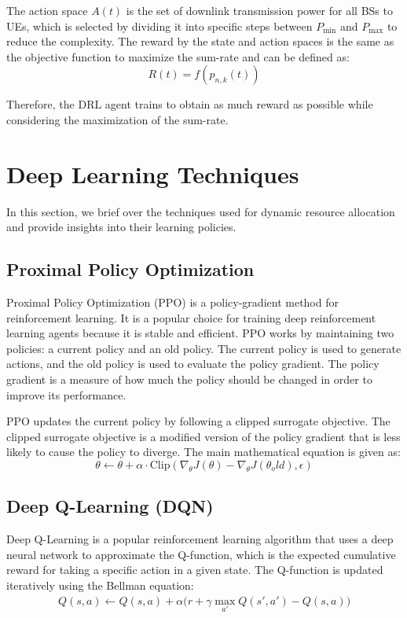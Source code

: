 \documentclass[conference]{IEEEtran}
\begin{document}
The action space $A(t)$ is the set of downlink transmission power for all BSs to UEs, which is selected by dividing it into specific steps between $P_{\min}$ and $P_{\max}$ to reduce the complexity. The reward by the state and action spaces is the same as the objective function to maximize the sum-rate and can be defined as:
\begin{equation} R(t) = f(p_{n,k}(t)) \end{equation}

Therefore, the DRL agent trains to obtain as much reward as possible while considering the maximization of the sum-rate.

\section{Deep Learning Techniques}
In this section, we brief over the techniques used for dynamic resource allocation and provide insights into their learning policies.

\subsection{Proximal Policy Optimization}
Proximal Policy Optimization (PPO) is a policy-gradient method for reinforcement learning. It is a popular choice for training deep reinforcement learning agents because it is stable and efficient.
PPO works by maintaining two policies: a current policy and an old policy. The current policy is used to generate actions, and the old policy is used to evaluate the policy gradient. The policy gradient is a measure of how much the policy should be changed in order to improve its performance.

PPO updates the current policy by following a clipped surrogate objective. The clipped surrogate objective is a modified version of the policy gradient that is less likely to cause the policy to diverge. The main mathematical equation is given as:
\begin{equation}
\theta \gets \theta + \alpha \cdot \text{Clip}(\nabla_{\theta} J(\theta) - \nabla_{\theta} J(\theta_old), \epsilon)
\end{equation}

\subsection{Deep Q-Learning (DQN)}
Deep Q-Learning is a popular reinforcement learning algorithm that uses a deep neural network to approximate the Q-function, which is the expected cumulative reward for taking a specific action in a given state. The Q-function is updated iteratively using the Bellman equation:
\begin{equation}
\begin{split}
Q(s,a) \leftarrow Q(s,a) + \alpha \Big( r + \gamma \max_{a'} Q(s',a') - Q(s,a) \Big)
\end{split}
\end{equation}
\end{document}
